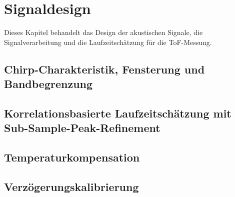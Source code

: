 \section{Signaldesign}

Dieses Kapitel behandelt das Design der akustischen Signale, die Signalverarbeitung und die Laufzeitschätzung für die ToF-Messung.

\subsection{Chirp-Charakteristik, Fensterung und Bandbegrenzung}



\subsection{Korrelationsbasierte Laufzeitschätzung mit Sub-Sample-Peak-Refinement}



\subsection{Temperaturkompensation}


\subsection{Verzögerungskalibrierung}

